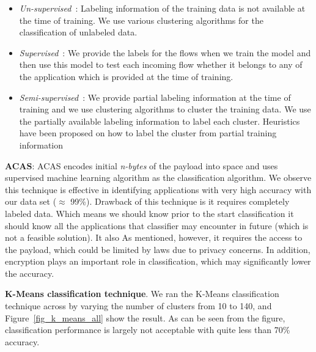 \documentclass[conference]{IEEEtran}
\begin{document}
\begin{itemize} \itemsep3pt \parskip3pt 
	\item \emph{Un-supervised}~\cite{}:
	Labeling information of the training data is not available at the time of training. We use various clustering algorithms for the classification of unlabeled data\cite{}.
	\item \emph{Supervised}~\cite{}:
	We provide the labels for the flows when we train the model and then use this model to test each incoming flow whether it belongs to any of the application which is provided at the time of training\cite{}.
	\item \emph{Semi-supervised}~\cite{}:
	We provide partial labeling information at the time of training and we use clustering algorithms to cluster the training data. We use the partially available labeling information to label each cluster. Heuristics have been proposed on how to label the cluster from partial training information\cite{}
\end{itemize}


\textbf{ACAS}\cite{ACAS}: ACAS encodes initial \textit{n-bytes} of the payload into space and uses supervised machine learning algorithm as the classification algorithm. We observe this technique is effective in identifying applications with very high accuracy with our data set ($\approx$ 99\%). Drawback of this technique is it requires completely labeled data. Which means we should know prior to the start classification it should know all the applications that classifier may encounter in future (which is not a feasible solution). It also
As mentioned, however, it requires the access to the payload, which could be limited by laws due to privacy concerns. In addition, encryption plays an important role in classification, which may significantly lower the accuracy.

\textbf{K-Means classification technique}\cite{Erman:2006:TCU:1162678.1162679}.
We ran the K-Means classification technique across by varying the number of clusters from 10 to 140, and Figure~\ref{fig_k_means_all} show the result.
As can be seen from the figure, classification performance is largely not acceptable with quite less than 70\% accuracy.
\end{document}
